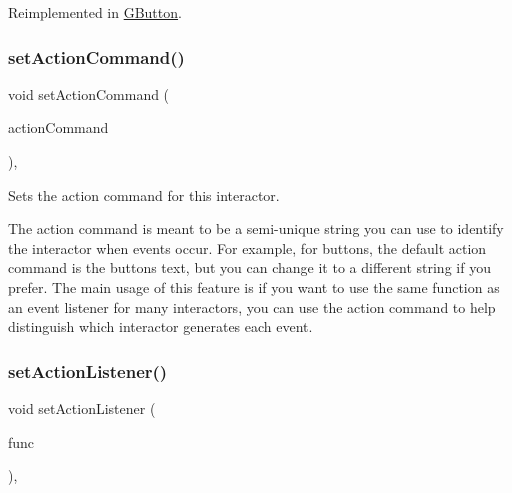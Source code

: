 Reimplemented in \mbox{\hyperlink{classGButton_a502f311e78e7531f8a7b50054ce91c85}{G\+Button}}.

\mbox{\label{classGInteractor_a4b5843fe3030e038a1ba54cc03389bcf}} 
\subsubsection{\texorpdfstring{set\+Action\+Command()}{setActionCommand()}}
{\footnotesize\ttfamily void set\+Action\+Command (\begin{DoxyParamCaption}\item[{const std\+::string \&}]{action\+Command }\end{DoxyParamCaption})\hspace{0.3cm}{\ttfamily [virtual]}, {\ttfamily [inherited]}}



Sets the action command for this interactor. 

The action command is meant to be a semi-\/unique string you can use to identify the interactor when events occur. For example, for buttons, the default action command is the button\textquotesingle{}s text, but you can change it to a different string if you prefer. The main usage of this feature is if you want to use the same function as an event listener for many interactors, you can use the action command to help distinguish which interactor generates each event. \mbox{\label{classGInteractor_adcfb4742430c88714fcf57e57ab8ea9c}} 
\subsubsection{\texorpdfstring{set\+Action\+Listener()}{setActionListener()}\hspace{0.1cm}{\footnotesize\ttfamily [1/2]}}
{\footnotesize\ttfamily void set\+Action\+Listener (\begin{DoxyParamCaption}\item[{G\+Event\+Listener}]{func }\end{DoxyParamCaption})\hspace{0.3cm}{\ttfamily [virtual]}, {\ttfamily [inherited]}}



